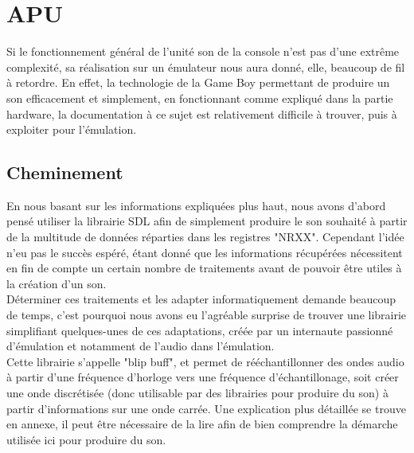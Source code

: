 \documentclass{report}
\begin{document}
\section{APU}
	Si le fonctionnement général de l'unité son de la console n'est pas d'une extrême complexité, sa réalisation sur un émulateur nous aura donné, elle, beaucoup de fil à retordre.
	En effet, la technologie de la Game Boy permettant de produire un son efficacement et simplement, en fonctionnant comme expliqué dans la partie hardware, la documentation à ce sujet est relativement difficile à trouver, puis à exploiter pour l'émulation.\\
\subsection{Cheminement}
	En nous basant sur les informations expliquées plus haut, nous avons d'abord pensé utiliser la librairie SDL afin de simplement produire le son souhaité à partir de la multitude de données réparties dans les registres "NRXX". Cependant l'idée n'eu pas le succès espéré, étant donné que les informations récupérées nécessitent en fin de compte un certain nombre de traitements avant de pouvoir être utiles à la création d'un son.\\
	Déterminer ces traitements et les adapter informatiquement demande beaucoup de temps, c'est pourquoi nous avons eu l'agréable surprise de trouver une librairie simplifiant quelques-unes de ces adaptations, créée par un internaute passionné d'émulation et notamment de l'audio dans l'émulation.\\
	Cette librairie s'appelle "blip buff", et permet de rééchantillonner des ondes audio à partir d'une fréquence d'horloge vers une fréquence d'échantillonage, soit créer une onde discrétisée (donc utilisable par des librairies pour produire du son) à partir d'informations sur une onde carrée. 
	Une explication plus détaillée se trouve en annexe, il peut être nécessaire de la lire afin de bien comprendre la démarche utilisée ici pour produire du son.
\end{document}
